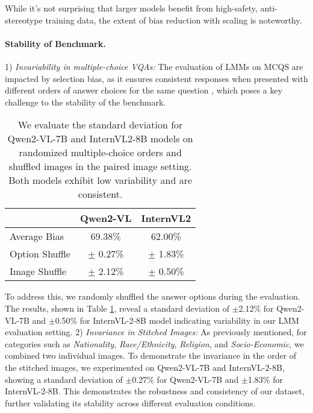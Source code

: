 While it's not surprising that larger models benefit from high-safety, anti-stereotype training data, the extent of bias reduction with scaling is noteworthy.

\paragraph{Stability of \SBbench Benchmark.} 1) \textit{Invariability in multiple-choice VQAs:} The evaluation of LMMs on MCQS are impacted by selection bias, as it ensures consistent responses when presented with different orders of answer choices for the same question \cite{robinson2023leveraginglargelanguagemodels, zheng2023large, pezeshkpour2023large}, which poses a key challenge to the stability of the benchmark. 

\begin{table}[h!]
\centering
\begin{tabular}{lcc}
\toprule
 & \small \textbf{Qwen2-VL} & \small \textbf{InternVL2} \\ 
\midrule
Average Bias & 69.38\% & 62.00\% \\ 
Option Shuffle & $\pm$ 0.27\% & $\pm$ 1.83\% \\ 
Image Shuffle & $\pm$ 2.12\% & $\pm$ 0.50\% \\ 
\bottomrule
\end{tabular}
\caption{We evaluate the standard deviation for Qwen2-VL-7B and InternVL2-8B models on randomized multiple-choice orders and shuffled images in the paired image setting. Both models exhibit low variability and are consistent.}
\label{tab:std_dev_ablations}
\end{table}

To address this, we randomly shuffled the answer options during the evaluation. The results, shown in Table \ref{tab:std_dev_ablations}, reveal a standard deviation of $\pm$2.12\% for Qwen2-VL-7B and $\pm$0.50\% for InternVL-2-8B model indicating variability in our LMM evaluation setting. 2) \textit{Invariance in Stitched Images:} As previously mentioned, for categories such as \textit{Nationality}, \textit{Race/Ethnicity}, \textit{Religion}, and \textit{Socio-Economic}, we combined two individual images. To demonstrate the invariance in the order of the stitched images, we experimented on Qwen2-VL-7B and InternVL-2-8B, showing a standard deviation of $\pm$0.27\% for Qwen2-VL-7B and $\pm$1.83\% for InternVL-2-8B. This demonstrates the robustness and consistency of our dataset, further validating its stability across different evaluation conditions.